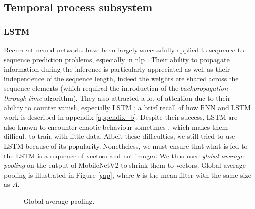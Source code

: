 \documentclass[12pt, a4paper]{report}
\begin{document}
			\subsection{Temporal process subsystem}\label{subsystems}
				\subsubsection{LSTM}\label{lstm}
					Recurrent neural networks have been largely successfully applied to sequence-to-sequence prediction problems, especially in \gls{nlp} \cite{wu2016google,shen2018natural,miao2020application}.
					Their ability to propagate information during the inference is particularly appreciated as well as their independence of the sequence length, indeed the weights are shared across the sequence elements (which required the introduction of the {\itshape backpropagation through time} algorithm).
					They also attracted a lot of attention due to their ability to counter \gls{vanish}, especially LSTM \cite{Hochreiter1997lstm}; a brief recall of how RNN and LSTM work is described in appendix \ref{appendix_b}.
					Despite their success, LSTM are also known to encounter chaotic behaviour sometimes \cite{bertschinger2004,laurent2016recurrent}, which makes them difficult to train with little data.
					Albeit these difficulties, we still tried to use LSTM because of its popularity.
					Nonetheless, we must ensure that what is fed to the LSTM is a sequence of vectors and not images.
					We thus used {\itshape global average pooling} on the output of MobileNetV2 to shrink them to vectors.
					Global average pooling is illustrated in Figure \ref{gap}, where $k$ is the mean filter with the same size as $A$.
					\begin{figure}[h!]
						\centering
						\caption{Global average pooling.}
					\end{figure}
\end{document}
